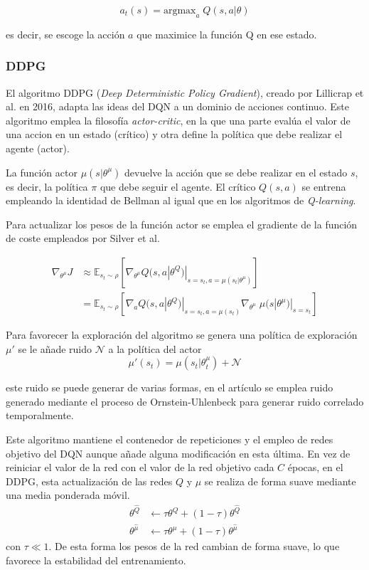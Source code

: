 \begin{equation}		
		a_t(s) = \text{argmax}_a\;Q(s,a|\theta) 
\end{equation}

es decir, se escoge la acción $a$ que maximice la función Q en ese estado.
\subsubsection{DDPG}

El algoritmo DDPG (\textit{Deep Deterministic Policy Gradient}), creado por Lillicrap et al.  en 2016, adapta las ideas del DQN a un dominio de acciones continuo. Este algoritmo emplea la filosofía \textit{actor-critic}, en la que una parte evalúa el valor de una accion en un estado (crítico) y  otra define la política que debe realizar el agente (actor).

La función actor $\mu(s|\theta^\mu)$ devuelve la acción que se debe realizar en el estado $s$, es decir, la política $\pi$ que debe seguir el agente. El crítico $Q(s,a)$ se entrena empleando la identidad de Bellman al igual que en los algoritmos de \textit{Q-learning}.

Para actualizar los pesos de la función actor se emplea el gradiente de la función de coste empleados por Silver et al.  

	\begin{align}
		\nabla_{\theta^\mu}J &\approx \mathbb{E}_{s_t \sim \rho}\left[ \nabla_{\theta^\mu} Q(s,a |\theta^Q)|_{s=s_t,a=\mu(s_t|\theta^\mu)}\right]\\
		&=  \mathbb{E}_{s_t \sim \rho}\left[ \nabla_{a} Q(s,a |\theta^Q)|_{s=s_t,a=\mu(s_t)} \nabla_{\theta^\mu}\; \mu(s|\theta^\mu)|_{s=s_t}    \right]\nonumber 
	\end{align}

Para favorecer la exploración del algoritmo se genera una política de exploración $\mu'$ se le añade ruido $\mathcal{N}$ a la política del actor
	\begin{equation}
		 \mu'(s_t)=\mu(s_t|\theta^\mu_t) + \mathcal{N}
	\end{equation}

este ruido se puede generar de varias formas, en el artículo se emplea ruido generado mediante el proceso de Ornstein-Uhlenbeck  para generar ruido correlado temporalmente.

Este algoritmo mantiene el contenedor de repeticiones y el empleo de redes objetivo del DQN aunque añade alguna modificación en esta última. En vez de reiniciar el valor de la red  con el valor de la red objetivo cada $C$ épocas, en el DDPG, esta actualización de las redes $Q$ y $\mu$ se realiza de forma suave mediante una media ponderada móvil.
\begin{align}
\theta ^{\hat Q} &\leftarrow \tau \theta ^ Q + (1 - \tau)\theta^{\hat Q}\\
\theta ^{\hat \mu} &\leftarrow \tau \theta ^ \mu + (1 - \tau)\theta^{\hat \mu}
\end{align}
con $\tau \ll  1$. De esta forma los pesos de la red cambian de forma suave, lo que favorece la estabilidad del entrenamiento. 

